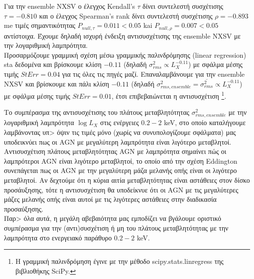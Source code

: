 Για την \textlatin{ensemble NXSV} ο έλεγχος \textlatin{Kendall's} $\tau$ δίνει συντελεστή συσχέτισης $\tau = -0.810$ και ο έλεγχος \textlatin{Spearman's rank} δίνει συντελεστή συσχέτισης $\rho= -0.893$ me τιμές σημαντικότητας $P_{null, \tau} =0.011<0.05$ kai $P_{null, \rho} = 0.007<0.05$ αντίστοιχα. Έχουμε δηλαδή ισχυρή ένδειξη αντισυσχέτισης της \textlatin{ensemble NXSV} με την λογαριθμική λαμπρότητα.\\ 
Προσαρμόζουμε γραμμική σχέση μέσω γραμμικής παλινδρόμησης (\textlatin{linear regression}) sta δεδομένα και βρίσκουμε κλίση $-0.11$ (δηλαδή $\sigma_{rms}^2\propto L_X^{-0.11}$) με σφάλμα μέσης τιμής $StErr = 0.04 $ για τις όλες τις πηγές μαζί. Επαναλαμβάνουμε για την \textlatin{ensemble NXSV} και βρίσκουμε και πάλι κλίση $-0.11$ (δηλαδή $\sigma_{rms, ensemble}^2= \overline{\sigma_{rms}^2}\propto L_X^{-0.11}$) με σφάλμα μέσης τιμής $StErr = 0.01 $, έτσι επιβεβαιώνεται η αντισυσχέτιση \footnote{Η γραμμική παλινδρόμηση έγινε με την μέθοδο \textlatin{scipy.stats.linregress} της βιβλιοθήκης \textlatin{SciPy.}}.

Το συμπέρασμα της αντισυσχέτισης του πλάτους μεταβλητότητας $\sigma_{rms, ensemble}^2$ με την λογαριθμική λαμπρότητα $\log L_X$ στις ενέργειες $0.2-2$ \textlatin{keV}, στο οποίο καταλήγουμε λαμβάνοντας υπ> όψιν τις τιμές μόνο (χωρίς να συνυπολογίζουμε σφάλματα) μας υποδεικνύει πως οι \textlatin{AGN} με μεγαλύτερη λαμπρότητα είναι λιγότερο μεταβλητοί.\\
Αντισυσχέτιση πλάτους μεταβλητότητας \textlatin{AGN} με λαμπρότητα σημαίνει πώς οι λαμπρότεροι \textlatin{AGN} είναι λιγότερο μεταβλητοί, το οποίο από την σχέση \textlatin{Eddington} συνεπάγεται πως οι \textlatin{AGN} με την μεγαλύτερη μάζα μελανής οπής είναι οι λιγότερο μεταβλητοί. Αν δεχτούμε ότι η κύρια αιτία μεταβλητότητας είναι αστάθειες στον δίσκο προσάυξησης, τότε η αντισυσχέτιση θα υποδείκνυε ότι οι \textlatin{AGN} με τις μεγαλύτερες μάζες μελανής οπής είναι αυτοί με τις λιγότερες αστάθειες στην διαδικασία προσαύξησης.\\
Παρ> όλα αυτά, η μεγάλη αβεβαιότητα μας εμποδίζει να βγάλουμε οριστικό συμπέρασμα για την (αντι)συσχέτιση ή μη του πλάτους μεταβλητότητας με την λαμπρότητα στο ενεργειακό παράθυρο $0.2-2$ \textlatin{keV}. 


